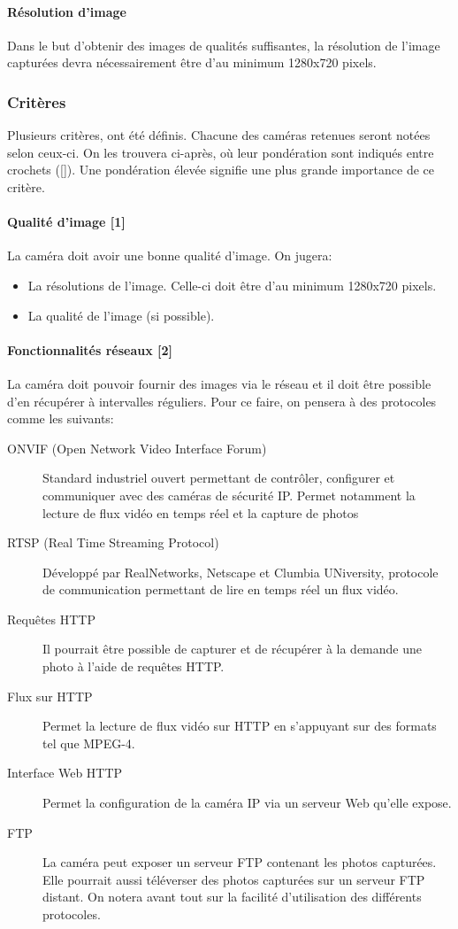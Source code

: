 \paragraph{Résolution d'image}
Dans le but d'obtenir des images de qualités suffisantes, la résolution de l'image capturées devra nécessairement être d'au minimum 1280x720 pixels.

\subsubsection{Critères}
Plusieurs critères, ont été définis. Chacune des caméras retenues seront notées selon ceux-ci. On les trouvera ci-après, où leur pondération sont indiqués entre crochets ([]). Une pondération élevée signifie une plus grande importance de ce critère.

\paragraph{Qualité d'image [1]}
La caméra doit avoir une bonne qualité d'image. On jugera:
\begin{itemize}
    \item La résolutions de l'image. Celle-ci doit être d'au minimum 1280x720 pixels.
    \item La qualité de l'image (si possible).
\end{itemize}

\paragraph{Fonctionnalités réseaux [2]}
La caméra doit pouvoir fournir des images via le réseau et il doit être possible d'en récupérer à intervalles réguliers. Pour ce faire, on pensera à des protocoles comme les suivants: 
\begin{description}
    \item[ONVIF (Open Network Video Interface Forum)] Standard industriel ouvert permettant de contrôler, configurer et communiquer avec des caméras de sécurité IP. Permet notamment la lecture de flux vidéo en temps réel et la capture de photos \autocite{wiki:onvif}
    \item[RTSP (Real Time Streaming Protocol)] Développé par RealNetworks, Netscape et Clumbia UNiversity, protocole de communication permettant de lire en temps réel un flux vidéo. \autocite{wiki:RTSP}
    \item[Requêtes HTTP] Il pourrait être possible de capturer et de récupérer à la demande une photo à l'aide de requêtes HTTP.
    \item[Flux sur HTTP] Permet la lecture de flux vidéo sur HTTP en s'appuyant sur des formats tel que MPEG-4.
    \item[Interface Web HTTP] Permet la configuration de la caméra IP via un serveur Web qu'elle expose. 
    \item[FTP] La caméra peut exposer un serveur FTP contenant les photos capturées. Elle pourrait aussi téléverser des photos capturées sur un serveur FTP distant.
On notera avant tout sur la facilité d'utilisation des différents protocoles.
\end{description}

